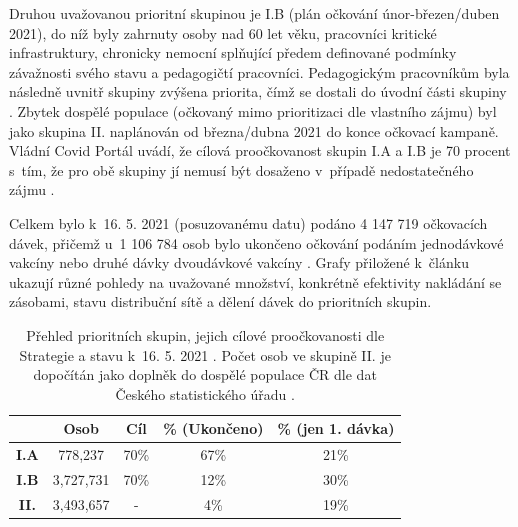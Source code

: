 %
Druhou uvažovanou prioritní skupinou je I.B (plán očkování únor-březen/duben 2021), do níž byly zahrnuty osoby nad 60 let věku, pracovníci kritické infrastruktury, chronicky nemocní splňující předem definované podmínky závažnosti svého stavu a pedagogičtí pracovníci. %
Pedagogickým pracovníkům byla následně uvnitř skupiny zvýšena priorita, čímž se dostali do úvodní části skupiny \cite{prioritizace_ockovani}. Zbytek dospělé populace (očkovaný mimo prioritizaci dle vlastního zájmu) byl jako skupina II. naplánován od března/dubna 2021 do konce očkovací kampaně. Vládní Covid Portál uvádí, že cílová proočkovanost skupin I.A a I.B je 70 procent s~tím, že pro obě skupiny jí nemusí být dosaženo v~případě nedostatečného zájmu \cite{kdoprvni}.

Celkem bylo k~16. 5. 2021 (posuzovanému datu) podáno 4 147 719 očkovacích dávek, přičemž u~1 106 784 osob bylo ukončeno očkování podáním jednodávkové vakcíny nebo druhé dávky dvoudávkové vakcíny \cite{mzcr_data}. Grafy přiložené k~článku ukazují různé pohledy na uvažované množství, konkrétně efektivity nakládání se zásobami, stavu distribuční sítě a dělení dávek do prioritních skupin.



\begin{table}
\begin{minipage}{\textwidth} 
\begin{centering}
\begin{tabular}{|c|c|c|c|c|}
\hline
& \textbf{Osob} & \textbf{Cíl} & \textbf{\% (Ukončeno)} & \textbf{\% (jen 1. dávka)}  \\
\hline
\textbf{I.A} & 778,237 & 70\% & 67\% & 21\% \\
\hline
\textbf{I.B} & 3,727,731 & 70\% & 12\% & 30\%\\
\hline
\textbf{II.} & 3,493,657 & - & 4\% & 19\% \\
\hline
\end{tabular}
	\caption{Přehled prioritních skupin, jejich cílové proočkovanosti dle Strategie a stavu k~16. 5. 2021 \cite{strategie_covid}. Počet osob ve skupině II. je dopočítán jako doplněk do dospělé populace ČR dle dat Českého statistického úřadu \cite{obyvatele_pocet}.}
    \label{tab_skupiny}
    
    \end{centering}
\end{minipage}
\end{table}


